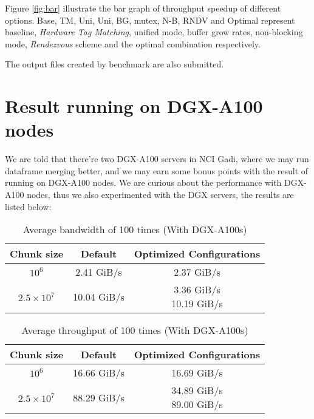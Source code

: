 \documentclass{article}
\begin{document}
Figure \ref{fig:bar} illustrate the bar graph of throughput speedup of different options. \textsf{Base}, \textsf{TM}, \textsf{Uni}, \textsf{Uni}, \textsf{BG}, \textsf{mutex}, \textsf{N-B}, \textsf{RNDV} and \textsf{Optimal} represent baseline, \textit{Hardware Tag Matching}, unified mode, buffer grow rates, non-blocking mode, \textit{Rendezvous} scheme and the optimal combination respectively.

The output files created by benchmark are also submitted.




\section{Result running on DGX-A100 nodes}

We are told that there’re two DGX-A100 servers in NCI Gadi, where we may run dataframe merging better, and we may earn some bonus points with the result of running on DGX-A100 nodes. We are curious about the performance with DGX-A100 nodes, thus we also experimented with the DGX servers, the results are listed below:

\begin{table}[h!]
    \centering
    \caption{Average bandwidth of 100 times (With DGX-A100s)}
    \begin{tabular}{c|c|c}
      \textbf{Chunk size} & \textbf{Default} & \textbf{Optimized Configurations}\\
      \hline
      $10^6$ & 2.41 GiB/s & 2.37 GiB/s\\
      $2.5\times10^7$ & 10.04 GiB/s & \makecell{3.36 GiB/s\footnotemark\\10.19 GiB/s\footnotemark}
    \end{tabular}
    \label{tab:a100_bw}
\end{table}

\begin{table}[h!]
    \centering
    \caption{Average throughput of 100 times (With DGX-A100s)}
    \begin{tabular}{c|c|c}
      \textbf{Chunk size} & \textbf{Default} & \textbf{Optimized Configurations}\\
      \hline
      $10^6$ & 16.66 GiB/s & 16.69 GiB/s\\
      $2.5\times10^7$ & 88.29 GiB/s & \makecell{34.89 GiB/s\footnotemark\\89.00 GiB/s\footnotemark}
    \end{tabular}
    \label{tab:a100}
\end{table}
\end{document}
